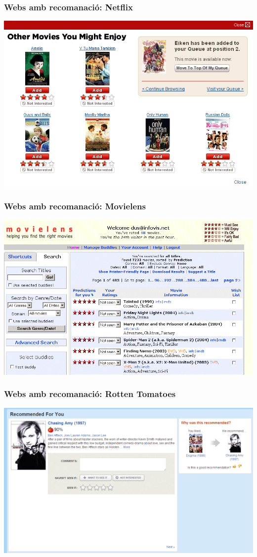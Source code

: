 \documentclass[catalan]{beamer}
\begin{document}
\begin{frame}
\frametitle{Webs amb recomanació: Netflix}
\includegraphics[width=\textwidth]{figs/netflix-recommendations}
\end{frame}

\begin{frame}
\frametitle{Webs amb recomanació: Movielens}
\includegraphics[width=\textwidth]{figs/movielens-recommendations}
\end{frame}

\begin{frame}
\frametitle{Webs amb recomanació: Rotten Tomatoes}
\includegraphics[width=\textwidth]{figs/rotten-tomatoes-recommendations}
\end{frame}
\end{document}
